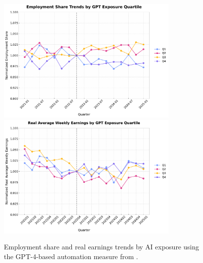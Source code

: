 \documentclass[12pt]{article}
\numberwithin{equation}{section}
\theoremstyle{theorem}\newcustomtheorem{theorem}{{\bf\sc Theorem}}
\theoremstyle{definition}\newcustomtheorem{assumption}{{\bf\sc Assumption}}
\theoremstyle{theorem} \newcustomtheorem{proposition}{{\bf\sc Proposition}}
\begin{document}
\begin{figure}[htbp]
	\centering
  \includegraphics[width=0.8\textwidth]{../figures/employment_share_by_automation_quartile_2021Q1.pdf}
  \includegraphics[width=0.8\textwidth]{../figures/real_earnings_by_automation_quartile_2021Q1.pdf}
	\caption{Employment share and real earnings trends by AI exposure using the GPT-4-based automation measure from \citet{eloundou_gpts_2024}.}
	\label{fig:employment_trends_automation}
\end{figure}
\end{document}
